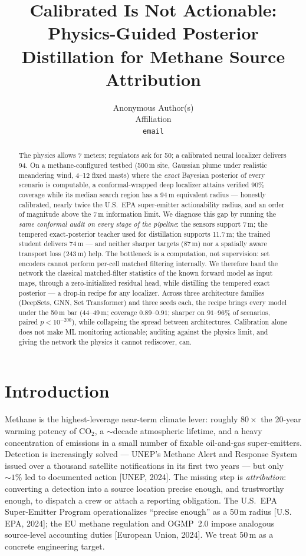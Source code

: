 \documentclass{article}
\title{Calibrated Is Not Actionable:\\
Physics-Guided Posterior Distillation for Methane Source Attribution}
\author{Anonymous Author(s)\\ Affiliation\\ \texttt{email}}
\begin{document}
\maketitle

\begin{abstract}
The physics allows 7 meters; regulators ask for 50; a calibrated neural
localizer delivers 94. On a methane-configured testbed (500\,m site, Gaussian
plume under realistic meandering wind, 4--12 fixed masts) where the
\emph{exact} Bayesian posterior of every scenario is computable, a
conformal-wrapped deep localizer attains verified $90\%$ coverage while its
median search region has a 94\,m equivalent radius --- honestly calibrated,
nearly twice the U.S.~EPA super-emitter actionability radius, and an order of
magnitude above the 7\,m information limit. We diagnose this gap by running the
\emph{same conformal audit on every stage of the pipeline}: the sensors support
7\,m; the tempered exact-posterior teacher used for distillation supports
11.7\,m; the trained student delivers 74\,m --- and neither sharper targets
(87\,m) nor a spatially aware transport loss (243\,m) help. The bottleneck is a
computation, not supervision: set encoders cannot perform per-cell matched
filtering internally. We therefore hand the network the classical
matched-filter statistics of the known forward model as input maps, through a
zero-initialized residual head, while distilling the tempered exact posterior
--- a drop-in recipe for any localizer. Across three architecture families
(DeepSets, GNN, Set Transformer) and three seeds each, the recipe brings every
model under the 50\,m bar (44--49\,m; coverage $0.89$--$0.91$; sharper on
$91$--$96\%$ of scenarios, paired $p<10^{-200}$), while collapsing the
spread between architectures. Calibration alone does not make ML monitoring
actionable; auditing against the physics limit, and giving the network the
physics it cannot rediscover, can.
\end{abstract}

\section{Introduction}

Methane is the highest-leverage near-term climate lever: roughly $80\times$ the
20-year warming potency of CO$_2$, a $\sim$decade atmospheric lifetime, and a
heavy concentration of emissions in a small number of fixable oil-and-gas
super-emitters. Detection is increasingly solved --- UNEP's Methane Alert and
Response System issued over a thousand satellite notifications in its first two
years --- but only $\sim\!1\%$ led to documented action [UNEP, 2024]. The
missing step is \emph{attribution}: converting a detection into a source
location precise enough, and trustworthy enough, to dispatch a crew or attach a
reporting obligation. The U.S.~EPA Super-Emitter Program operationalizes
``precise enough'' as a 50\,m radius [U.S. EPA, 2024]; the EU methane
regulation and OGMP~2.0 impose analogous source-level accounting duties
[European Union, 2024]. We treat 50\,m as a concrete engineering target.
\end{document}
